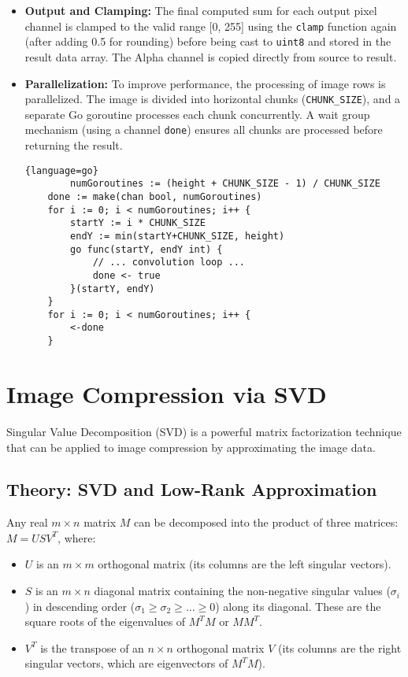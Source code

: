 \documentclass{article}
\begin{document}
\begin{itemize}
\begin{lstlisting}{language=go}
                alphaIndex := (y*width+x)*4 + 3
                resultData[alphaIndex] = srcData[alphaIndex]
            }
        }
    \end{lstlisting}
    \item \textbf{Output and Clamping:} The final computed sum for each output pixel channel is clamped to the valid range [0, 255] using the \texttt{clamp} function again (after adding 0.5 for rounding) before being cast to \texttt{uint8} and stored in the result data array. The Alpha channel is copied directly from source to result.
    \item \textbf{Parallelization:} To improve performance, the processing of image rows is parallelized. The image is divided into horizontal chunks (\texttt{CHUNK\_SIZE}), and a separate Go goroutine processes each chunk concurrently. A wait group mechanism (using a channel \texttt{done}) ensures all chunks are processed before returning the result.
    \begin{lstlisting}{language=go}
        numGoroutines := (height + CHUNK_SIZE - 1) / CHUNK_SIZE
    done := make(chan bool, numGoroutines)
    for i := 0; i < numGoroutines; i++ {
        startY := i * CHUNK_SIZE
        endY := min(startY+CHUNK_SIZE, height)
        go func(startY, endY int) {
            // ... convolution loop ...
            done <- true
        }(startY, endY)
    }
    for i := 0; i < numGoroutines; i++ {
        <-done
    }
    \end{lstlisting}
\end{itemize}

\section{Image Compression via SVD}
\label{sec:svd}
Singular Value Decomposition (SVD) is a powerful matrix factorization technique that can be applied to image compression by approximating the image data.

\subsection{Theory: SVD and Low-Rank Approximation}
Any real $m \times n$ matrix $M$ can be decomposed into the product of three matrices: $M = U S V^T$, where:
\begin{itemize}
    \item $U$ is an $m \times m$ orthogonal matrix (its columns are the left singular vectors).
    \item $S$ is an $m \times n$ diagonal matrix containing the non-negative singular values ($\sigma_i$) in descending order ($\sigma_1 \ge \sigma_2 \ge \dots \ge 0$) along its diagonal. These are the square roots of the eigenvalues of $M^T M$ or $M M^T$.
    \item $V^T$ is the transpose of an $n \times n$ orthogonal matrix $V$ (its columns are the right singular vectors, which are eigenvectors of $M^T M$).
\end{itemize}
\end{document}
